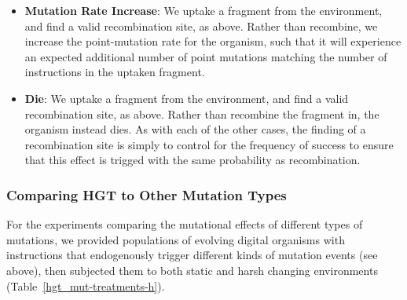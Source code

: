 \documentclass[PhD]{msu-thesis}
\begin{document}
\begin{itemize}
	\item \textbf{Mutation Rate Increase}: We uptake a fragment from the environment, and find a valid recombination site, as above. Rather than recombine, we increase the point-mutation rate for the organism, such that it will experience an expected additional number of point mutations matching the number of instructions in the uptaken fragment.

	\item \textbf{Die}: We uptake a fragment from the environment, and find a valid recombination site, as above. Rather than recombine the fragment in, the organism instead dies.	As with each of the other cases, the finding of a recombination site is simply to control for the frequency of success to ensure that this effect is trigged with the same probability as recombination.
\end{itemize}	

\subsubsection{Comparing HGT to Other Mutation Types}

For the experiments comparing the mutational effects of different types of mutations, we provided populations of evolving digital organisms with instructions that endogenously trigger different kinds of mutation events (see above), then subjected them to both static and harsh changing environments (Table~\ref{hgt_mut-treatments-h}).  
\end{document}
